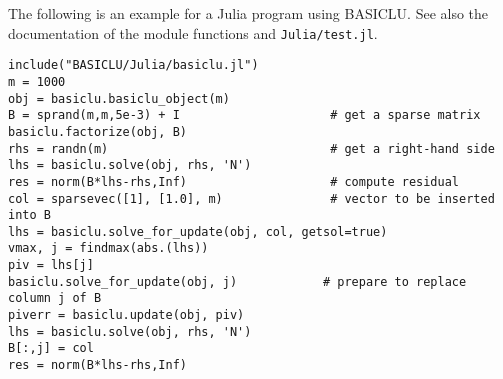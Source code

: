 \documentclass{article}
\newcommand{\ct}{\texttt}
\begin{document}
The following is an example for a Julia program using BASICLU. See also the
documentation of the module functions and \ct{Julia/test.jl}.
{\footnotesize
\begin{verbatim}
include("BASICLU/Julia/basiclu.jl")
m = 1000
obj = basiclu.basiclu_object(m)
B = sprand(m,m,5e-3) + I                     # get a sparse matrix
basiclu.factorize(obj, B)
rhs = randn(m)                               # get a right-hand side
lhs = basiclu.solve(obj, rhs, 'N')
res = norm(B*lhs-rhs,Inf)                    # compute residual
col = sparsevec([1], [1.0], m)               # vector to be inserted into B
lhs = basiclu.solve_for_update(obj, col, getsol=true)
vmax, j = findmax(abs.(lhs))
piv = lhs[j]
basiclu.solve_for_update(obj, j)            # prepare to replace column j of B
piverr = basiclu.update(obj, piv)
lhs = basiclu.solve(obj, rhs, 'N')
B[:,j] = col
res = norm(B*lhs-rhs,Inf)
\end{verbatim}
}
\end{document}
